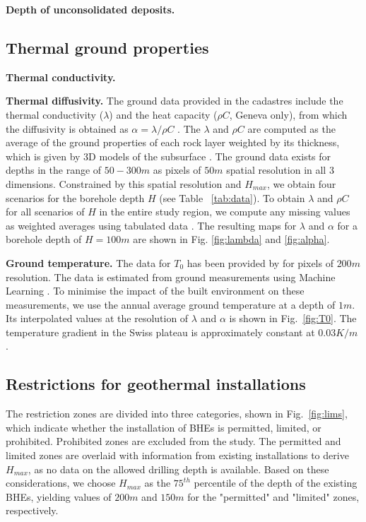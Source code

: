 \textbf{Depth of unconsolidated deposits.}

\subsection{Thermal ground properties}

\textbf{Thermal conductivity.}

\textbf{Thermal diffusivity.}
The ground data provided in the cadastres include the thermal conductivity ($\lambda$) and the heat capacity ($\rho C$, Geneva only), from which the diffusivity is obtained as $\alpha = \lambda / \rho C$ \cite{pahud_geothermal_2002}.
The $\lambda$ and $\rho C$ are computed as the average of the ground properties of each rock layer weighted by %
its thickness, which is given by 3D models of the subsurface \cite{groupe_de_travail_pgg_evaluation_2011-1}.
The ground data exists for depths in the range of $50-300m$ as pixels of $50m$ spatial resolution in all 3 dimensions. 
Constrained by this spatial resolution and $H_{max}$, we obtain four scenarios for the borehole depth $H$ (see Table ~\ref{tab:data}).
To obtain $\lambda$ and $\rho C$ for all scenarios of $H$ in the entire study region, we compute any missing values as weighted averages using
tabulated data \cite{groupe_de_travail_pgg_evaluation_2011-1, sia_sondes_2010}. 
The resulting maps for $\lambda$ and $\alpha$ for a borehole depth of $H = 100m$ are shown in Fig. \ref{fig:lambda} and \ref{fig:alpha}.

\textbf{Ground temperature.}
The data for $T_0$ has been provided by \citet{assouline_machine_2019} for pixels of $200m$ resolution.
The data is estimated from ground measurements using Machine Learning \cite{assouline_machine_2019}.
To minimise the impact of the built environment on these measurements, we use the annual average ground temperature at a depth of $1m$.
Its interpolated values at the resolution of $\lambda$ and $\alpha$ is shown in Fig.~\ref{fig:T0}.
The temperature gradient in the Swiss plateau is approximately constant at $0.03K/m$ \cite{sia_sondes_2010}.

\subsection{Restrictions for geothermal installations}

The restriction zones are divided into three categories, shown in Fig.~\ref{fig:lims}, which indicate whether the installation of BHEs is permitted, limited, or prohibited.
Prohibited zones are excluded from the study. 
The permitted and limited zones are overlaid with information from existing installations to derive $H_{max}$, as no data on the allowed drilling depth is available.
Based on these considerations,
we choose $H_{max}$ as the $75^{th}$ percentile of the depth of the existing BHEs, yielding values of $200m$ and $150m$ for the "permitted" and "limited" zones, respectively. 
